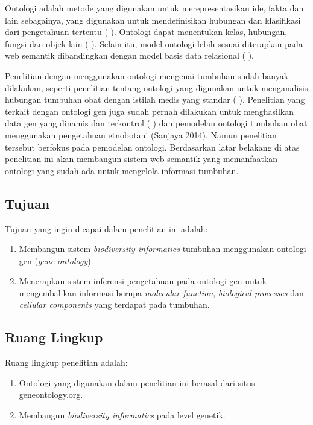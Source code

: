 Ontologi adalah metode yang digunakan untuk merepresentasikan ide, fakta dan lain sebagainya, yang digunakan untuk mendefinisikan hubungan dan klasifikasi dari pengetahuan tertentu (\citeauthor{JEPSEN2010} \cite*{JEPSEN2010}). Ontologi dapat menentukan kelas, hubungan, fungsi dan objek lain (\citeauthor{DILECCE2008} \cite*{DILECCE2008}). Selain itu, model ontologi lebih sesuai diterapkan pada web semantik dibandingkan dengan model basis data relasional (\citeauthor{LAALLAM2013} \cite*{LAALLAM2013}).

Penelitian dengan menggunakan ontologi mengenai tumbuhan sudah banyak dilakukan, seperti penelitian tentang ontologi yang digunakan untuk menganalisis hubungan tumbuhan obat dengan istilah medis yang standar (\citeauthor{VADIVU2012} \cite*{VADIVU2012}). Penelitian yang terkait dengan ontologi gen juga sudah pernah dilakukan untuk menghasilkan data gen yang dinamis dan terkontrol (\citeauthor{ASHBURNERM2000} \cite*{ASHBURNERM2000}) dan pemodelan ontologi tumbuhan obat menggunakan pengetahuan etnobotani (Sanjaya 2014). Namun penelitian tersebut berfokus pada pemodelan ontologi. Berdasarkan latar belakang di atas penelitian ini akan membangun sistem web semantik yang memanfaatkan ontologi yang sudah ada untuk mengelola informasi tumbuhan.

\subsection*{Tujuan}
Tujuan yang ingin dicapai dalam penelitian ini adalah:
\begin{enumerate}[noitemsep] 
	\item Membangun sistem \textit{biodiversity informatics} tumbuhan menggunakan ontologi gen (\textit{gene ontology}).
	\item Menerapkan sistem inferensi pengetahuan pada ontologi gen untuk mengembalikan informasi berupa \textit{molecular function}, \textit{biological processes} dan \textit{cellular components} yang terdapat pada tumbuhan.
\end{enumerate}

\subsection*{Ruang Lingkup}
Ruang lingkup penelitian adalah:
\begin{enumerate}[noitemsep] 
	\item Ontologi yang digunakan dalam penelitian ini berasal dari situs geneontology.org.
	\item Membangun \textit{biodiversity informatics} pada level genetik.
\end{enumerate}

